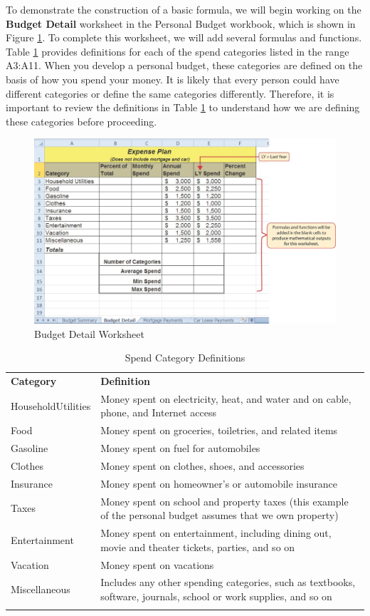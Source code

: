 To demonstrate the construction of a basic formula, we will begin working on the \textbf{Budget Detail} worksheet in the Personal Budget workbook, which is shown in Figure \ref{02:fig02}. To complete this worksheet, we will add several formulas and functions. Table \ref{02:tab01} provides definitions for each of the spend categories listed in the range \textsf{A3:A11}. When you develop a personal budget, these categories are defined on the basis of how you spend your money. It is likely that every person could have different categories or define the same categories differently. Therefore, it is important to review the definitions in Table \ref{02:tab01} to understand how we are defining these categories before proceeding.

\begin{figure}[H]
	\centering
	\includegraphics[width=\maxwidth{.95\linewidth}]{gfx/ch02_fig02}
	\caption{Budget Detail Worksheet}
	\label{02:fig02}
\end{figure}

{\small
	\begin{longtable}{p{0.85in}p{2.8in}}
		\textbf{Category} & \textbf{Definition} \endhead
		\hline \\
		Household\newline Utilities & Money spent on electricity, heat, and water and on cable, phone, and Internet access\\
		Food & Money spent on groceries, toiletries, and related items\\
		Gasoline & Money spent on fuel for automobiles\\
		Clothes & Money spent on clothes, shoes, and accessories\\
		Insurance & Money spent on homeowner's or automobile insurance\\
		Taxes & Money spent on school and property taxes (this example of the personal budget assumes that we own property)\\
		Entertainment & Money spent on entertainment, including dining out, movie and theater tickets, parties, and so on\\
		Vacation & Money spent on vacations\\
		Miscellaneous & Includes any other spending categories, such as textbooks, software, journals, school or work supplies, and so on\\
		\hline
		\caption{Spend Category Definitions}
		\label{02:tab01}
	\end{longtable}
}

